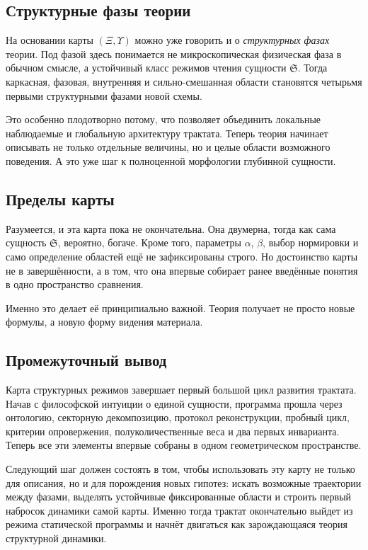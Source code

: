 \documentclass[12pt,a4paper]{article}
\begin{document}
\subsection{Структурные фазы теории}

На основании карты \((\Xi,\Upsilon)\) можно уже говорить и о \textit{структурных фазах} теории. Под фазой здесь понимается не микроскопическая физическая фаза в обычном смысле, а устойчивый класс режимов чтения сущности \(\mathfrak{S}\). Тогда каркасная, фазовая, внутренняя и сильно-смешанная области становятся четырьмя первыми структурными фазами новой схемы.

Это особенно плодотворно потому, что позволяет объединить локальные наблюдаемые и глобальную архитектуру трактата. Теперь теория начинает описывать не только отдельные величины, но и целые области возможного поведения. А это уже шаг к полноценной морфологии глубинной сущности.

\subsection{Пределы карты}

Разумеется, и эта карта пока не окончательна. Она двумерна, тогда как сама сущность \(\mathfrak{S}\), вероятно, богаче. Кроме того, параметры \(\alpha\), \(\beta\), выбор нормировки и само определение областей ещё не зафиксированы строго. Но достоинство карты не в завершённости, а в том, что она впервые собирает ранее введённые понятия в одно пространство сравнения.

Именно это делает её принципиально важной. Теория получает не просто новые формулы, а новую форму видения материала.

\subsection{Промежуточный вывод}

Карта структурных режимов завершает первый большой цикл развития трактата. Начав с философской интуиции о единой сущности, программа прошла через онтологию, секторную декомпозицию, протокол реконструкции, пробный цикл, критерии опровержения, полуколичественные веса и два первых инварианта. Теперь все эти элементы впервые собраны в одном геометрическом пространстве.

Следующий шаг должен состоять в том, чтобы использовать эту карту не только для описания, но и для порождения новых гипотез: искать возможные траектории между фазами, выделять устойчивые фиксированные области и строить первый набросок динамики самой карты. Именно тогда трактат окончательно выйдет из режима статической программы и начнёт двигаться как зарождающаяся теория структурной динамики.
\end{document}
